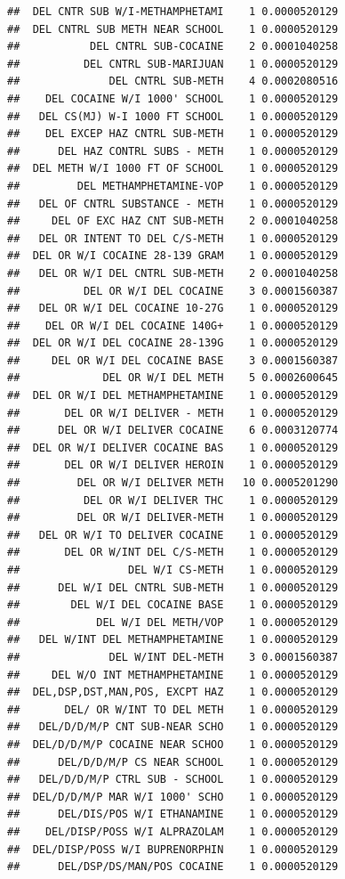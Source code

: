 \documentclass[]{book}
\begin{document}
\begin{verbatim}
##  DEL CNTR SUB W/I-METHAMPHETAMI    1 0.0000520129
##  DEL CNTRL SUB METH NEAR SCHOOL    1 0.0000520129
##           DEL CNTRL SUB-COCAINE    2 0.0001040258
##          DEL CNTRL SUB-MARIJUAN    1 0.0000520129
##              DEL CNTRL SUB-METH    4 0.0002080516
##    DEL COCAINE W/I 1000' SCHOOL    1 0.0000520129
##   DEL CS(MJ) W-I 1000 FT SCHOOL    1 0.0000520129
##    DEL EXCEP HAZ CNTRL SUB-METH    1 0.0000520129
##      DEL HAZ CONTRL SUBS - METH    1 0.0000520129
##  DEL METH W/I 1000 FT OF SCHOOL    1 0.0000520129
##         DEL METHAMPHETAMINE-VOP    1 0.0000520129
##   DEL OF CNTRL SUBSTANCE - METH    1 0.0000520129
##     DEL OF EXC HAZ CNT SUB-METH    2 0.0001040258
##   DEL OR INTENT TO DEL C/S-METH    1 0.0000520129
##  DEL OR W/I COCAINE 28-139 GRAM    1 0.0000520129
##   DEL OR W/I DEL CNTRL SUB-METH    2 0.0001040258
##          DEL OR W/I DEL COCAINE    3 0.0001560387
##   DEL OR W/I DEL COCAINE 10-27G    1 0.0000520129
##    DEL OR W/I DEL COCAINE 140G+    1 0.0000520129
##  DEL OR W/I DEL COCAINE 28-139G    1 0.0000520129
##     DEL OR W/I DEL COCAINE BASE    3 0.0001560387
##             DEL OR W/I DEL METH    5 0.0002600645
##  DEL OR W/I DEL METHAMPHETAMINE    1 0.0000520129
##       DEL OR W/I DELIVER - METH    1 0.0000520129
##      DEL OR W/I DELIVER COCAINE    6 0.0003120774
##  DEL OR W/I DELIVER COCAINE BAS    1 0.0000520129
##       DEL OR W/I DELIVER HEROIN    1 0.0000520129
##         DEL OR W/I DELIVER METH   10 0.0005201290
##          DEL OR W/I DELIVER THC    1 0.0000520129
##         DEL OR W/I DELIVER-METH    1 0.0000520129
##   DEL OR W/I TO DELIVER COCAINE    1 0.0000520129
##       DEL OR W/INT DEL C/S-METH    1 0.0000520129
##                 DEL W/I CS-METH    1 0.0000520129
##      DEL W/I DEL CNTRL SUB-METH    1 0.0000520129
##        DEL W/I DEL COCAINE BASE    1 0.0000520129
##            DEL W/I DEL METH/VOP    1 0.0000520129
##   DEL W/INT DEL METHAMPHETAMINE    1 0.0000520129
##              DEL W/INT DEL-METH    3 0.0001560387
##     DEL W/O INT METHAMPHETAMINE    1 0.0000520129
##  DEL,DSP,DST,MAN,POS, EXCPT HAZ    1 0.0000520129
##       DEL/ OR W/INT TO DEL METH    1 0.0000520129
##   DEL/D/D/M/P CNT SUB-NEAR SCHO    1 0.0000520129
##  DEL/D/D/M/P COCAINE NEAR SCHOO    1 0.0000520129
##      DEL/D/D/M/P CS NEAR SCHOOL    1 0.0000520129
##   DEL/D/D/M/P CTRL SUB - SCHOOL    1 0.0000520129
##  DEL/D/D/M/P MAR W/I 1000' SCHO    1 0.0000520129
##      DEL/DIS/POS W/I ETHANAMINE    1 0.0000520129
##    DEL/DISP/POSS W/I ALPRAZOLAM    1 0.0000520129
##  DEL/DISP/POSS W/I BUPRENORPHIN    1 0.0000520129
##      DEL/DSP/DS/MAN/POS COCAINE    1 0.0000520129

\end{verbatim}
\end{document}
